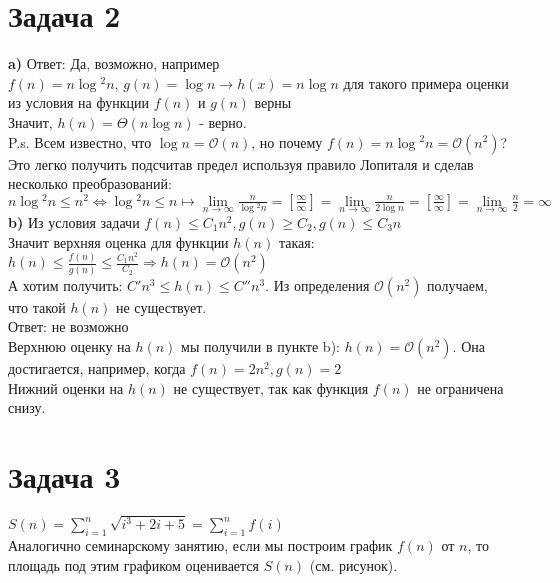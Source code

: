 \documentclass[a4paper,12pt]{article} %
\begin{document}
\section*{Задача 2}
\textbf{a)} Ответ: Да, возможно, например\\
$ f(n) = n\log{}^2n $, $ g(n) = \log{}n \rightarrow
h(x) = n\log{}n $ для такого примера оценки из условия на функции $ f(n) $ и $ g(n) $ верны  \\
Значит, $ h(n) = \Theta(n\log{}n) $ - верно.\\
P.s. Всем известно, что $ \log{}n =  \mathcal{O}(n)$, но почему   $f(n) = n\log{}^2n = \mathcal{O}(n^2)$?\\
Это легко получить подсчитав предел используя правило Лопиталя и сделав несколько преобразований:\\
 $ n\log{}^2n \leq n^2 \Leftrightarrow 
\log{}^2n \leq n \longmapsto 
 \lim\limits_{n\to\infty}\frac{n}{\log{}^2n} =
\left[ \frac{\infty}{\infty} \right] = 
\lim\limits_{n\to\infty}\frac{n}{2\log{}n} = 
\left[ \frac{\infty}{\infty} \right] = 
\lim\limits_{n\to\infty}\frac{n}{2} = \infty$   \\[1cm]
\textbf{b)} Из условия задачи $ f(n) \leq C_1n^2, g(n) \geq C_2, g(n) \leq C_3n $\\
Значит верхняя оценка для функции $ h(n) $ такая:\\
$ h(n) \leq \frac{f(n)}{g(n)} \leq \frac{C_1n^2}{C_2} \Longrightarrow 
h(n) = \mathcal{O}(n^2)$\\
А хотим получить: $ C'n^3 \leq h(n) \leq C''n^3 $. Из определения $ \mathcal{O}(n^2) $ получаем, что такой $ h(n) $ не существует.\\
Ответ: не возможно\\[1cm]
Верхнюю оценку на $ h(n) $ мы получили в пункте b): $ h(n) = \mathcal{O}(n^2)  $. Она достигается, например, когда $ f(n) = 2n^2, g(n) = 2 $ \\
Нижний оценки на $h(n)$ не существует, так как функция $ f(n) $ не ограничена снизу.

\section*{Задача 3}
$S(n) = \sum\limits_{i=1}^{n} \sqrt{i^{3}+2 i+5}=\sum\limits_{i=1}^{n} f(i)$\\
Аналогично семинарскому занятию, если мы построим график $f(n)$ от $ n $, то площадь под этим графиком оценивается $ S(n) $ (см. рисунок). 
\end{document}
